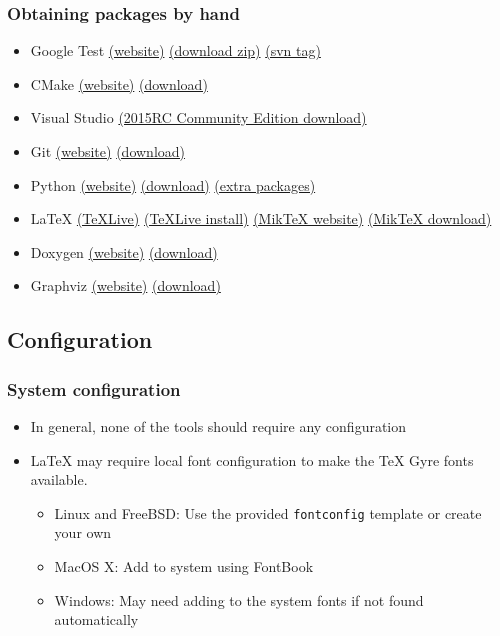 \documentclass{beamer}
\newcommand{\pkg}[1]{\texttt{#1}}
\begin{document}
\begin{frame}
  \frametitle{Obtaining packages by hand}
  \scriptsize
  \begin{itemize}
  \item Google Test \dotfill \href{https://code.google.com/p/googletest/}{(website)} \href{https://code.google.com/p/googletest/downloads/detail?name=gtest-1.7.0.zip}{(download zip)} \href{http://googletest.googlecode.com/svn/tags/release-1.7.0}{(svn tag)}
  \item CMake \dotfill \href{http://cmake.org/}{(website)} \href{http://cmake.org/cmake/resources/software.html}{(download)}
  \item Visual Studio \dotfill \href{https://www.visualstudio.com/en-us/downloads/visual-studio-2015-downloads-vs.aspx}{(2015RC Community Edition download)}
  \item Git \dotfill \href{http://www.git-scm.com/}{(website)} \href{http://www.git-scm.com/downloads}{(download)}
  \item Python \dotfill \href{https://www.python.org/}{(website)} \href{https://www.python.org/download/releases/2.7.8/}{(download)} \href{http://www.lfd.uci.edu/\~gohlke/pythonlibs/}{(extra packages)}
  \item \LaTeX{} \dotfill \href{https://www.tug.org/texlive/}{(\TeX{}Live)} \href{https://www.tug.org/texlive/quickinstall.html}{(\TeX{}Live install)} \href{http://www.miktex.org/}{(Mik\TeX{} website)} \href{http://www.miktex.org/download}{(Mik\TeX{} download)}
  \item Doxygen \dotfill \href{http://www.stack.nl/\~dimitri/doxygen/}{(website)} \href{http://www.stack.nl/\~dimitri/doxygen/download.html}{(download)}
  \item Graphviz \dotfill \href{http://graphviz.org/}{(website)} \href{http://graphviz.org/Download\_windows.php}{(download)}
  \end{itemize}
\end{frame}

\subsection{Configuration}

\begin{frame}
  \frametitle{System configuration}
  \begin{itemize}
    \item In general, none of the tools should require any configuration
      \item \LaTeX{} may require local font configuration to make the \TeX{} Gyre fonts available.
        \begin{itemize}
          \item Linux and FreeBSD: Use the provided \pkg{fontconfig}
            template or create your own
          \item MacOS X: Add to system using FontBook
          \item Windows: May need adding to the system fonts if not
            found automatically
        \end{itemize}
  \end{itemize}
\end{frame}
\end{document}

